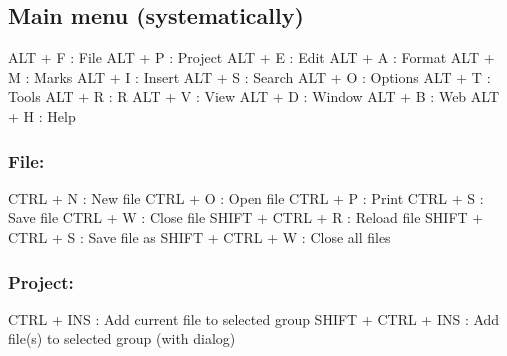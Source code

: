 \newpage
\hypertarget{basic_card_mainmenu}{}
\subsection{Main menu (systematically)}

\vspace{-0.5cm}
\begin{Rtables}[caption={[Main menu keyboard shortcuts]
    Main Menu keyboard shortcuts},
  label=menu:main]
  ALT + F                 : File
  ALT + P                 : Project
  ALT + E                 : Edit
  ALT + A                 : Format
  ALT + M                 : Marks
  ALT + I                 : Insert
  ALT + S                 : Search
  ALT + O                 : Options
  ALT + T                 : Tools
  ALT + R                 : R
  ALT + V                 : View
  ALT + D                 : Window
  ALT + B                 : Web
  ALT + H                 : Help
\end{Rtables}


\subsubsection{File:}

\vspace{-0.5cm}
\begin{Rtables}[caption={[File menu keyboard shortcuts]
    File menu keyboard shortcuts},
  label=menu:file]
  CTRL  + N               : New file
  CTRL  + O               : Open file
  CTRL  + P               : Print
  CTRL  + S               : Save file
  CTRL  + W               : Close file
  SHIFT + CTRL + R        : Reload file
  SHIFT + CTRL + S        : Save file as
  SHIFT + CTRL + W        : Close all files
\end{Rtables}


\subsubsection{Project:}

\vspace{-0.5cm}
\begin{Rtables}[caption={[Project menu keyboard shortcuts]
    Project keyboard shortcuts},
  label=menu:project]
  CTRL  + INS             : Add current file to selected group
  SHIFT + CTRL + INS      : Add file(s) to selected group (with dialog)
\end{Rtables}


